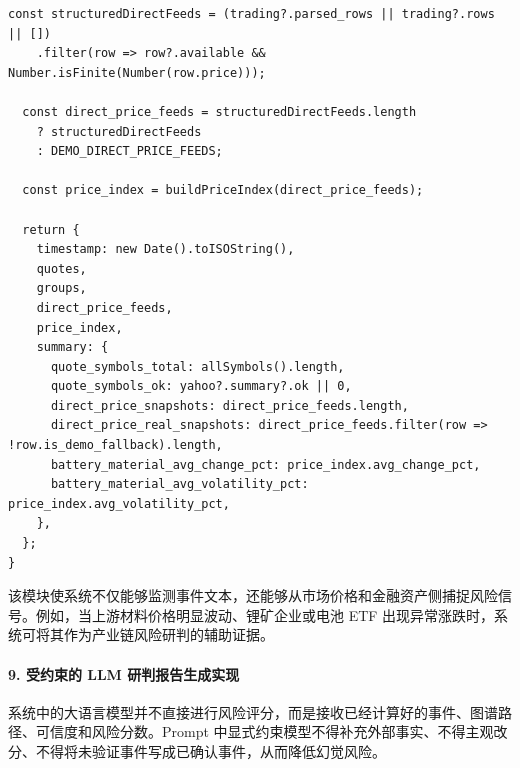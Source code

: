﻿\documentclass[12pt,a4paper]{article}
\begin{document}
\begin{lstlisting}[style=projectcode,caption={市场价格代理指标与材料价格指数构建}]
  const structuredDirectFeeds = (trading?.parsed_rows || trading?.rows || [])
    .filter(row => row?.available && Number.isFinite(Number(row.price)));

  const direct_price_feeds = structuredDirectFeeds.length
    ? structuredDirectFeeds
    : DEMO_DIRECT_PRICE_FEEDS;

  const price_index = buildPriceIndex(direct_price_feeds);

  return {
    timestamp: new Date().toISOString(),
    quotes,
    groups,
    direct_price_feeds,
    price_index,
    summary: {
      quote_symbols_total: allSymbols().length,
      quote_symbols_ok: yahoo?.summary?.ok || 0,
      direct_price_snapshots: direct_price_feeds.length,
      direct_price_real_snapshots: direct_price_feeds.filter(row => !row.is_demo_fallback).length,
      battery_material_avg_change_pct: price_index.avg_change_pct,
      battery_material_avg_volatility_pct: price_index.avg_volatility_pct,
    },
  };
}
\end{lstlisting}

该模块使系统不仅能够监测事件文本，还能够从市场价格和金融资产侧捕捉风险信号。例如，当上游材料价格明显波动、锂矿企业或电池 ETF 出现异常涨跌时，系统可将其作为产业链风险研判的辅助证据。

\paragraph{9. 受约束的 LLM 研判报告生成实现}

系统中的大语言模型并不直接进行风险评分，而是接收已经计算好的事件、图谱路径、可信度和风险分数。Prompt 中显式约束模型不得补充外部事实、不得主观改分、不得将未验证事件写成已确认事件，从而降低幻觉风险。
\end{document}
